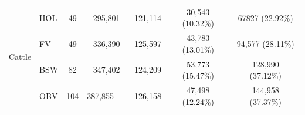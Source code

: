 \documentclass[../main.tex]{subfiles}
\begin{document}
\begin{flushleft}
\begin{landscape}
\begin{table}
\begin{tabular}{|c|l|c|c|c|c|c|}
    \hline
    \multirow{4}{*}{Cattle} & HOL                             & 49                                                          & 295,801       & 121,114                                                      & 30,543 (10.32\%)                                             & 67827 (22.92\%)                                                                             \\ 
    \cline{2-7}
                            & FV                              & 49                                                          & 336,390       & 125,597                                                      & 43,783 (13.01\%)                                             & 94,577 (28.11\%)                                                                            \\ 
    \cline{2-7}
                            & BSW                             & 82                                                          & 347,402       & 124,209                                                      & 53,773 (15.47\%)                                             & 128,990 (37.12\%)                                                                           \\ 
    \cline{2-7}
                            & OBV                             & 104                                                         & 387,855~~~    & 126,158                                                      & 47,498 (12.24\%)                                             & 144,958 (37.37\%)                                                                           \\
    \hline
    \end{tabular}
   \end{table}



\end{landscape}
\end{flushleft}
\end{document}
